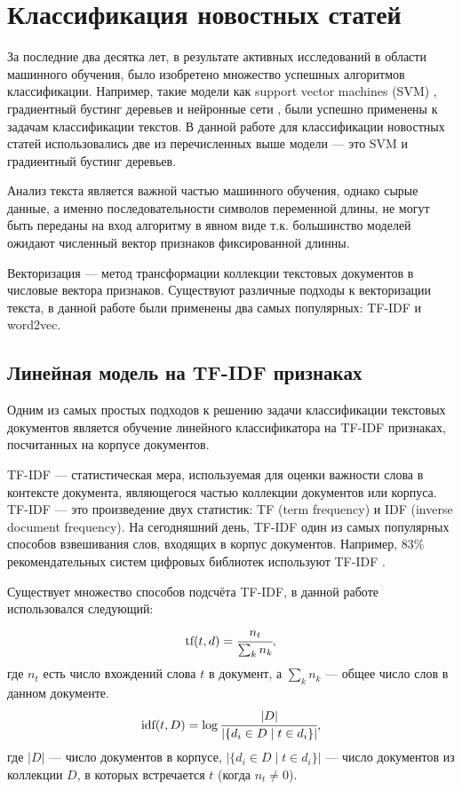 \documentclass[a4paper, 14pt]{extarticle}
\begin{document}
\section{Классификация новостных статей}
За последние два десятка лет, в результате активных исследований в области машинного обучения,
было изобретено множество успешных алгоритмов классификации. Например, такие модели как support vector machines (SVM) \cite{weston99svms},
градиентный бустинг деревьев и нейронные сети \cite{DBLP:journals/corr/ConneauSBL16}, были успешно применены к задачам классификации текстов.
В данной работе для классификации новостных статей использовались две из перечисленных выше модели --- это SVM и градиентный бустинг
деревьев.

Анализ текста является важной частью машинного обучения, однако сырые данные, а именно последовательности символов переменной длины,
не могут быть переданы на вход алгоритму в явном виде т.к. большинство моделей ожидают численный вектор признаков фиксированной длинны.

Векторизация --- метод трансформации коллекции текстовых документов в числовые вектора признаков.
Существуют различные подходы к векторизации текста, в данной работе были применены два самых популярных: TF-IDF и word2vec.

\subsection{Линейная модель на TF-IDF признаках}
Одним из самых простых подходов к решению задачи классификации текстовых документов является обучение линейного классификатора на
TF-IDF признаках, посчитанных на корпусе документов.

TF-IDF --- статистическая мера, используемая для оценки важности слова в контексте 
документа, являющегося частью коллекции документов или корпуса.\cite{doi:10.1108/eb026526}
TF-IDF --- это произведение двух статистик: TF (term frequency) и IDF (inverse 
document frequency). На сегодняшний день, TF-IDF один из самых популярных способов взвешивания слов, входящих в корпус документов.
Например, 83\% рекомендательных систем цифровых библиотек используют TF-IDF \cite{Beel2016}.

Существует множество способов подсчёта TF-IDF, в данной работе использовался следующий:
$$
\text{tf}(t, d) = \cfrac{n_t}{\sum_{k} n_k},
$$
где $n_{t}$ есть число вхождений слова $t$ в документ, а $\sum_{k} n_k$ --- общее число слов в данном документе.
$$
\text{idf}(t, D) = \log{ \cfrac{|D|}{|\{ d_i \in D \mid t \in d_i \}|}},
$$
где $|D|$ --- число документов в корпусе, $|\{ d_i \in D \mid t \in d_i \}|$ — число документов из коллекции $D$, в которых встречается 
$t$ (когда $n_{t} \neq 0$).
\end{document}
